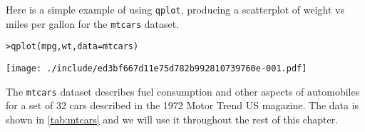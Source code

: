 Here is a  simple example of using {\tt qplot}, producing a scatterplot of weight vs miles per gallon for the {\tt mtcars} dataset.  

\begin{alltt}
> qplot(mpg, wt, data = mtcars)
\end{alltt}
\texttt{[image: ./include/ed3bf667d11e75d782b992810739760e-001.pdf]}
\begin{alltt}

\end{alltt}

The {\tt mtcars} dataset describes fuel consumption and other aspects of automobiles for a set of 32 cars described in the 1972 Motor Trend US magazine.  The data is shown in \ref{tab:mtcars} and we will use it throughout the rest of this chapter.

